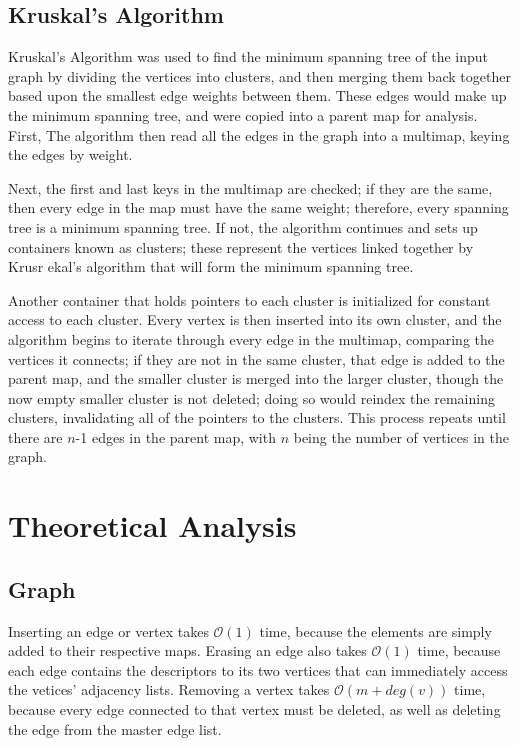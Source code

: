 \documentclass[titlepage]{article}
\begin{document}
\begin{multicols*}{2}
			\subsection{Kruskal's Algorithm}
                         Kruskal's Algorithm was used to find the minimum spanning tree of the input graph by dividing the vertices into clusters, and then merging them back together based upon the smallest edge weights between them. These edges would make up the minimum spanning tree, and were copied into a parent map for analysis. First, The algorithm then read all the edges in the graph into a multimap, keying the edges by weight. \par
                         Next, the first and last keys in the multimap are checked; if they are the same, then every edge in the map must have the same weight; therefore, every spanning tree is a minimum spanning tree. If not, the algorithm continues and sets up containers known as clusters; these represent the vertices linked together by Krusr ekal's algorithm that will form the minimum spanning tree.\par
                         Another container that holds pointers to each cluster is initialized for constant access to each cluster. Every vertex is then inserted into its own cluster, and the algorithm begins to iterate through every edge in the multimap, comparing the vertices it connects; if they are not in the same cluster, that edge is added to the parent map, and the smaller cluster is merged into the larger cluster, though the now empty smaller cluster is not deleted; doing so would reindex the remaining clusters, invalidating all of the pointers to the clusters. This process repeats until there are $n$-1 edges in the parent map, with $n$ being the number of vertices in the graph.
		\section{Theoretical Analysis}
			\subsection{Graph}
                        Inserting an edge or vertex takes $\mathcal{O}(1)$ time, because the elements are simply added to their respective maps. Erasing an edge also takes $\mathcal{O}(1)$ time, because each edge contains the descriptors to its two vertices that can immediately access the vetices' adjacency lists. Removing a vertex takes $\mathcal{O}(m+deg(v))$ time, because every edge connected to that vertex must be deleted, as well as deleting the edge from the master edge list.

\end{multicols*}
\end{document}
